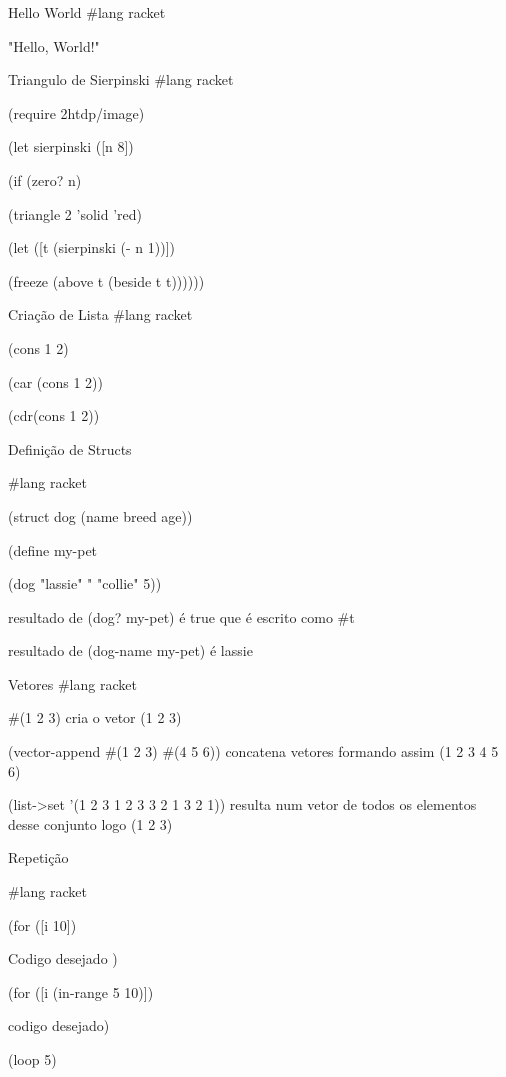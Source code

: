 \documentclass{beamer}
\begin{document}
\begin{frame}{Hello World}
\#lang racket

"Hello, World!"
\end{frame}


\begin{frame}{Triangulo de Sierpinski}
\#lang racket

(require 2htdp/image)

(let sierpinski ([n 8])

  (if (zero? n)
  
    (triangle 2 'solid 'red)
    
    (let ([t (sierpinski (- n 1))])
    
      (freeze (above t (beside t t))))))


\end{frame}


\begin{frame}{Criação de Lista}
\#lang racket

(cons 1 2)

(car (cons 1 2))

(cdr(cons 1 2))
        
\end{frame}


\begin{frame}{Definição de Structs}

\#lang racket

(struct dog (name breed age))

(define my-pet

  (dog "lassie" " "collie" 5))
  
resultado de (dog? my-pet) é true que é escrito como \#t

resultado de (dog-name my-pet) é lassie
  

\end{frame}
\begin{frame}{Vetores}
\#lang racket

\#(1 2 3) cria o vetor (1 2 3)

(vector-append \#(1 2 3) \#(4 5 6)) concatena vetores formando assim (1 2 3 4 5 6)

(list->set '(1 2 3 1 2 3 3 2 1 3 2 1)) resulta num vetor de todos os elementos desse conjunto logo (1 2 3)


\end{frame}
\begin{frame}{Repetição}

\#lang racket

(for ([i 10])

  Codigo desejado )
  
(for ([i (in-range 5 10)])

  codigo desejado)
    
(loop 5)

\end{frame}
\end{document}
